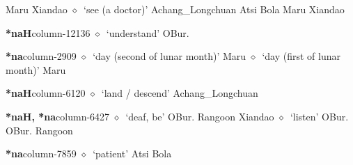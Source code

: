          Maru 
\hspace{1ex}
         Xiandao 
\hspace{1ex}
         $\diamond$~`see (a doctor)'
         Achang\_Longchuan 
\hspace{1ex}
         Atsi 
\hspace{1ex}
         Bola 
\hspace{1ex}
         Maru 
\hspace{1ex}
         Xiandao 
  \item {\footnotesize \textbf{*naH}}{\tiny column-12136}
         $\diamond$~`understand'
         OBur. 
  \item {\footnotesize \textbf{*na}}{\tiny column-2909}
         $\diamond$~`day (second of lunar month)'
         Maru 
\hspace{1ex}
         $\diamond$~`day (first of lunar month)'
         Maru 
  \item {\footnotesize \textbf{*naH}}{\tiny column-6120}
         $\diamond$~`land / descend'
         Achang\_Longchuan 
  \item {\footnotesize \textbf{*naH, *na}}{\tiny column-6427}
         $\diamond$~`deaf, be'
         OBur. 
\hspace{1ex}
         Rangoon 
\hspace{1ex}
         Xiandao 
\hspace{1ex}
         $\diamond$~`listen'
         OBur. 
\hspace{1ex}
         OBur. 
\hspace{1ex}
         Rangoon 
  \item {\footnotesize \textbf{*na}}{\tiny column-7859}
         $\diamond$~`patient'
         Atsi 
\hspace{1ex}
         Bola 
\hspace{1ex}
